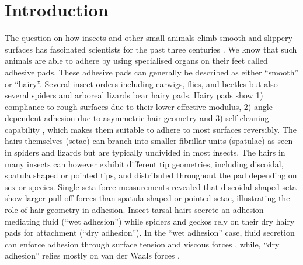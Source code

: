 \documentclass[vruler,JEB]{COB}%
\begin{document}

\section{Introduction}

The question on how insects and other small animals climb smooth and slippery
surfaces has fascinated scientists for the past three centuries \citep{RN198,RN59}. We know that such animals are able to adhere by using specialised organs on their feet called adhesive pads. These adhesive pads can generally be described as either ``smooth'' or ``hairy''. Several insect orders including earwigs, flies, and beetles \citep{Gorb:2001b} but also several spiders \citep{Coddington:1991} and arboreal lizards \citep{Williams:1982} bear hairy pads. Hairy pads show 1) compliance to rough surfaces due to their lower effective modulus, 2) angle dependent adhesion due to asymmetric hair geometry and 3) self-cleaning capability \citep{RN20}, which makes them suitable to adhere to most surfaces reversibly. The hairs themselves (setae) can branch into smaller fibrillar units (spatulae) as seen in spiders and lizards but are typically undivided in most insects. The hairs in many insects can however exhibit different tip geometries, including discoidal, spatula shaped or pointed tips, and distributed throughout the pad depending on sex or species\citep{RN19}. Single seta force measurements revealed that discoidal shaped seta show larger pull-off forces than spatula shaped or pointed setae\citep{RN79}, illustrating the role of hair geometry in adhesion. Insect tarsal hairs secrete an adhesion-mediating fluid (``wet adhesion'') while spiders and geckos rely on their dry hairy pads for attachment (``dry adhesion''). In the ``wet adhesion'' case, fluid secretion can enforce adhesion through surface tension and viscous forces \citep{RN201,RN155,RN71}, while, ``dry adhesion'' relies mostly on van der Waals forces \citep{RN202}. 
\end{document}
